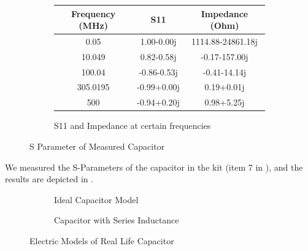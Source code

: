 \documentclass{article}
\begin{document}
\begin{figure}[h]
    \begin{subfigure}{\linewidth}
        \centering
        \begin{tabular}{ |c|c|c| }
            \hline
            Frequency (MHz) & S11         & Impedance (Ohm)
            \\\hline
            0.05            & 1.00-0.00j  & 1114.88-24861.18j
            \\\hline
            10.049          & 0.82-0.58j  & -0.17-157.00j
            \\\hline
            100.04          & -0.86-0.53j & -0.41-14.14j
            \\\hline
            305.0195        & -0.99+0.00j & 0.19+0.01j
            \\\hline
            500             & -0.94+0.20j & 0.98+5.25j
            \\\hline
        \end{tabular}
        \caption{S11 and Impedance at certain frequencies}
    \end{subfigure}

    \caption{S Parameter of Measured Capacitor}
    \label{fig:capacitor_meas}
\end{figure}

We measured the S-Parameters of the capacitor in the kit (item 7 in ), and the results are depicted in .

\begin{figure}
    \centering
    \begin{subfigure}{.5\linewidth}
        \centering
        \caption{Ideal Capacitor Model}
        \label{fig:capacitor_c}
    \end{subfigure}%
    \begin{subfigure}{.5\linewidth}
        \centering
        \caption{Capacitor with Series Inductance}
        \label{fig:capacitor_cl}
    \end{subfigure}%
    \caption{Electric Models of Real Life Capacitor}
\end{figure}
\end{document}

